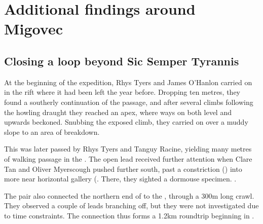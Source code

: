 \section{Additional findings around Migovec}


\subsection{Closing a loop beyond Sic Semper Tyrannis}
At the beginning of the expedition, Rhys Tyers and James O'Hanlon carried on in the  rift where it had been left the year before. Dropping ten metres, they found a southerly continuation of the passage, and after several climbs following the howling draught they reached an apex, where ways on both level and upwards beckoned. Snubbing the exposed climb, they carried on over a muddy slope to an area of breakdown. 

This was later passed by Rhys Tyers and Tanguy Racine, yielding many metres of walking passage in the . The open lead received further attention when Clare Tan and Oliver Myerscough pushed further south, past a constriction () into more near horizontal gallery (. There, they sighted a dormouse specimen. .

The pair also connected the northern end of  to the , through a 300m long crawl. They observed a couple of leads branching off, but they were not investigated due to time constraints. The connection thus forms a 1.2km roundtrip beginning in .

